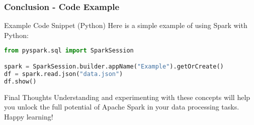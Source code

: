 \documentclass[aspectratio=169]{beamer}
\begin{document}
\begin{frame}[fragile]
    \frametitle{Conclusion - Code Example}
    \begin{block}{Example Code Snippet (Python)}
        Here is a simple example of using Spark with Python:
        \begin{lstlisting}[language=Python]
from pyspark.sql import SparkSession

spark = SparkSession.builder.appName("Example").getOrCreate()
df = spark.read.json("data.json")
df.show()
        \end{lstlisting}
    \end{block}
    
    \begin{block}{Final Thoughts}
        Understanding and experimenting with these concepts will help you unlock the full potential of Apache Spark in your data processing tasks. Happy learning!
    \end{block}
\end{frame}
\end{document}
